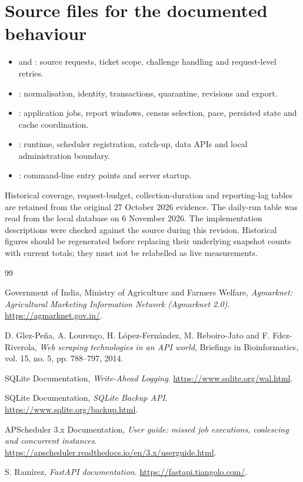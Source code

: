 \documentclass[12pt,a4paper,oneside]{report}
\numberwithin{equation}{chapter}
\numberwithin{figure}{chapter}
\numberwithin{table}{chapter}
\theoremstyle{definition}
\begin{document}
\section*{Source files for the documented behaviour}
\begin{itemize}
  \item {} and : source requests, ticket scope, challenge handling and request-level retries.
  \item {}: normalisation, identity, transactions, quarantine, revisions and export.
  \item {}: application jobs, report windows, census selection, pace, persisted state and cache coordination.
  \item {}: runtime, scheduler registration, catch-up, data APIs and local administration boundary.
  \item {}: command-line entry points and server startup.
\end{itemize}

Historical coverage, request-budget, collection-duration and reporting-lag tables are retained from the original 27 October 2026 evidence. The daily-run table was read from the local database on 6 November 2026. The implementation descriptions were checked against the source during this revision. Historical figures should be regenerated before replacing their underlying snapshot counts with current totals; they must not be relabelled as live measurements.

\begin{thebibliography}{99}

Government of India, Ministry of Agriculture and Farmers Welfare,
\emph{Agmarknet: Agricultural Marketing Information Network (Agmarknet 2.0)}.
\url{https://agmarknet.gov.in/}.

D. Glez-Pe\~na, A. Louren\c{c}o, H. L\'opez-Fern\'andez, M. Reboiro-Jato and F. Fdez-Riverola,
\emph{Web scraping technologies in an API world},
Briefings in Bioinformatics, vol. 15, no. 5, pp. 788--797, 2014.

SQLite Documentation, \emph{Write-Ahead Logging}.
\url{https://www.sqlite.org/wal.html}.

SQLite Documentation, \emph{SQLite Backup API}.
\url{https://www.sqlite.org/backup.html}.

APScheduler 3.x Documentation, \emph{User guide: missed job executions, coalescing and concurrent instances}.
\url{https://apscheduler.readthedocs.io/en/3.x/userguide.html}.

S. Ram\'irez, \emph{FastAPI documentation}.
\url{https://fastapi.tiangolo.com/}.

\end{thebibliography}
\end{document}
